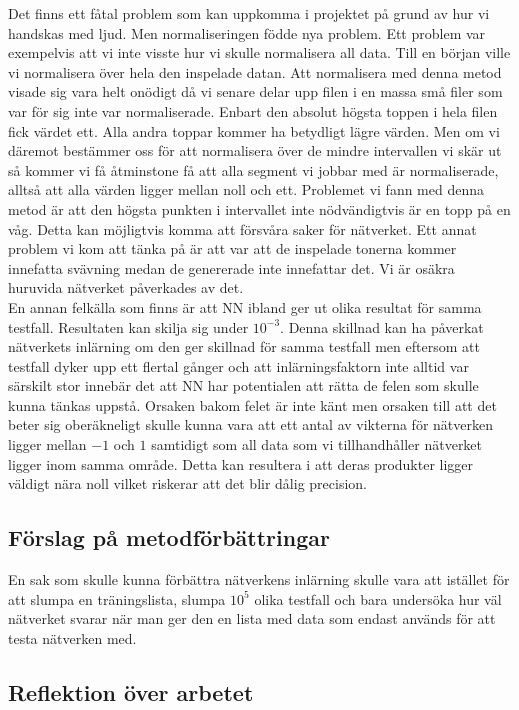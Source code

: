 \documentclass[a4paper,10pt]{article}
\begin{document}
Det finns ett fåtal problem som kan uppkomma i projektet på grund av hur vi handskas med ljud. 
Men normaliseringen födde nya problem. Ett problem var exempelvis att vi inte visste hur vi skulle normalisera all data. Till en början ville vi normalisera över hela den inspelade datan. Att normalisera med denna metod visade sig vara helt onödigt då vi senare delar upp filen i en massa små filer som var för sig inte var normaliserade. Enbart den absolut högsta toppen i hela filen fick värdet ett. Alla andra toppar kommer ha betydligt lägre värden. Men om vi däremot bestämmer oss för att normalisera över de mindre intervallen vi skär ut så kommer vi få åtminstone få att alla segment vi jobbar med är normaliserade, alltså att alla värden ligger mellan noll och ett. Problemet vi fann med denna metod är att den högsta punkten i intervallet inte nödvändigtvis är en topp på en våg. Detta kan möjligtvis komma att försvåra saker för nätverket. 
Ett annat problem vi kom att tänka på är att var att de inspelade tonerna kommer innefatta svävning medan de genererade inte innefattar det. Vi är osäkra huruvida nätverket påverkades av det. \\ 


En annan felkälla som finns är att NN ibland ger ut olika resultat för samma testfall. Resultaten kan skilja sig under $10^{-3}$. Denna skillnad kan ha påverkat nätverkets inlärning om den ger skillnad för samma testfall men eftersom att testfall dyker upp ett flertal gånger och att inlärningsfaktorn inte alltid var särskilt stor innebär det att NN har potentialen att rätta de felen som skulle kunna tänkas uppstå. Orsaken bakom felet är inte känt men orsaken till att det beter sig oberäkneligt skulle kunna vara att ett antal av vikterna för nätverken ligger mellan $-1$ och $1$ samtidigt som all data som vi tillhandhåller nätverket ligger inom samma område. Detta kan resultera i att deras produkter ligger väldigt nära noll vilket riskerar att det blir dålig precision. 

\subsection{Förslag på metodförbättringar}

En sak som skulle kunna förbättra nätverkens inlärning skulle vara att istället för att slumpa en träningslista, slumpa $10^5$ olika testfall och bara undersöka hur väl nätverket svarar när man ger den en lista med data som endast används för att testa nätverken med. 

\subsection{Reflektion över arbetet}
\end{document}
